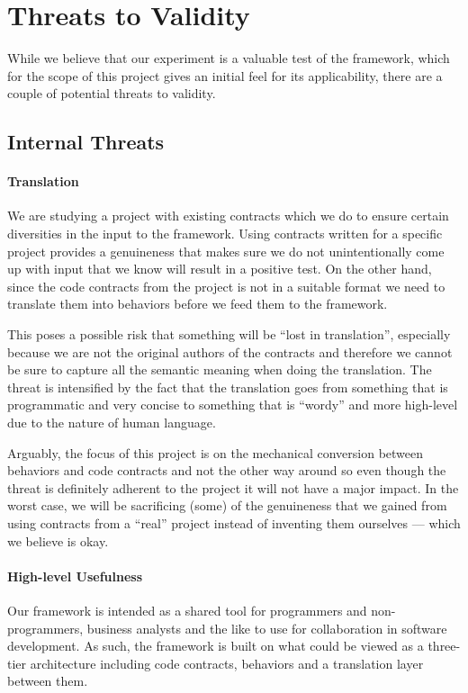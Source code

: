 \section{Threats to Validity}
While we believe that our experiment  is a valuable test of the framework, which for the scope of this project gives an initial feel for its applicability, there are a couple of potential threats to validity.

\subsection{Internal Threats}
\paragraph{Translation}
We are studying a project with existing contracts which we do to ensure certain diversities in the input to the framework. Using contracts written for a specific project provides a genuineness that makes sure we do not unintentionally come up with input that we know will result in a positive test. On the other hand, since the code contracts from the project is not in a suitable format we need to translate them into behaviors before we feed them to the framework.
 
This poses a possible risk that something will be ``lost in translation'', especially because we are not the original authors of the contracts and therefore we cannot be sure to capture all the semantic meaning when doing the translation. The threat is intensified by the fact that the translation goes from something that is programmatic and very concise to something that is ``wordy'' and more high-level due to the nature of human language.
 
Arguably, the focus of this project is on the mechanical conversion between behaviors and code contracts and not the other way around so even though the threat is definitely adherent to the project it will not have a major impact. In the worst case, we will be sacrificing (some) of the genuineness that we gained from using contracts from a ``real'' project instead of inventing them ourselves --- which we believe is okay.

\paragraph{High-level Usefulness}
Our framework is intended as a shared tool for programmers and non-programmers, business analysts and the like to use for collaboration in software development. As such, the framework is built on what could be viewed as a three-tier architecture including code contracts, behaviors and a translation layer between them.
 
